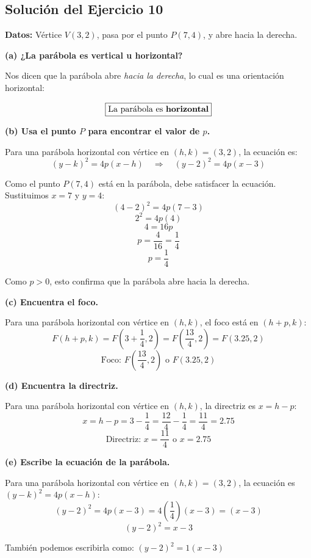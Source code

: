 \documentclass[12pt,a4paper]{article}
\begin{document}
	\newpage

	\subsection*{Solución del Ejercicio 10}

	\textbf{Datos:} Vértice \(V(3,2)\), pasa por el punto \(P(7,4)\), y abre hacia la derecha.

	\bigskip

	\textbf{(a) ¿La parábola es vertical u horizontal?}

	Nos dicen que la parábola abre \emph{hacia la derecha}, lo cual es una orientación horizontal:

	\[
	\boxed{\text{La parábola es \textbf{horizontal}}}
	\]

	\textbf{(b) Usa el punto \(P\) para encontrar el valor de \(p\).}

	Para una parábola horizontal con vértice en \((h,k)=(3,2)\), la ecuación es:
	\[
	(y-k)^2=4p(x-h) \quad\Rightarrow\quad (y-2)^2=4p(x-3)
	\]

	Como el punto \(P(7,4)\) está en la parábola, debe satisfacer la ecuación. Sustituimos \(x=7\) y \(y=4\):
	\[
	(4-2)^2=4p(7-3)
	\]
	\[
	2^2=4p(4)
	\]
	\[
	4=16p
	\]
	\[
	p=\frac{4}{16}=\frac{1}{4}
	\]
	\[
	\boxed{p=\frac{1}{4}}
	\]

	Como \(p>0\), esto confirma que la parábola abre hacia la derecha.

	\textbf{(c) Encuentra el foco.}

	Para una parábola horizontal con vértice en \((h,k)\), el foco está en \((h+p,k)\):
	\[
	F(h+p,k)=F\left(3+\frac{1}{4},2\right)=F\left(\frac{13}{4},2\right)=F(3.25,2)
	\]
	\[
	\boxed{\text{Foco: } F\left(\frac{13}{4},2\right) \text{ o } F(3.25,2)}
	\]

	\textbf{(d) Encuentra la directriz.}

	Para una parábola horizontal con vértice en \((h,k)\), la directriz es \(x=h-p\):
	\[
	x=h-p=3-\frac{1}{4}=\frac{12}{4}-\frac{1}{4}=\frac{11}{4}=2.75
	\]
	\[
	\boxed{\text{Directriz: } x=\frac{11}{4} \text{ o } x=2.75}
	\]

	\textbf{(e) Escribe la ecuación de la parábola.}

	Para una parábola horizontal con vértice en \((h,k)=(3,2)\), la ecuación es \((y-k)^2=4p(x-h)\):
	\[
	(y-2)^2=4p(x-3)=4\left(\frac{1}{4}\right)(x-3)=(x-3)
	\]
	\[
	\boxed{(y-2)^2=x-3}
	\]

	También podemos escribirla como: \((y-2)^2=1(x-3)\)
\end{document}
